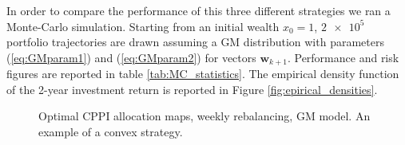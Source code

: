 In order to compare the performance of this three different strategies we ran a Monte-Carlo simulation. Starting from an initial wealth $x_0=1$, $\num{2e5}$ portfolio trajectories are drawn assuming a GM distribution with parameters (\ref{eq:GMparam1}) and (\ref{eq:GMparam2}) for vectors $\bm{w}_{k+1}$. Performance and risk figures are reported in table \ref{tab:MC_statistics}. The empirical density function of the 2-year investment return is reported in Figure \ref{fig:epirical_densities}.








\begin{figure}[]
	\caption{Optimal CPPI allocation maps, weekly rebalancing, GM model. An example of a convex strategy.}
	\label{fig:mapsMixtureCPPI}
\end{figure}


